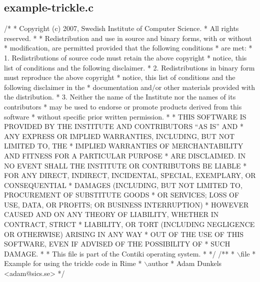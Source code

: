 \hypertarget{a00034}{}\subsection{example-\/trickle.\+c}

\begin{DoxyCodeInclude}
\textcolor{comment}{/*}
\textcolor{comment}{ * Copyright (c) 2007, Swedish Institute of Computer Science.}
\textcolor{comment}{ * All rights reserved.}
\textcolor{comment}{ *}
\textcolor{comment}{ * Redistribution and use in source and binary forms, with or without}
\textcolor{comment}{ * modification, are permitted provided that the following conditions}
\textcolor{comment}{ * are met:}
\textcolor{comment}{ * 1. Redistributions of source code must retain the above copyright}
\textcolor{comment}{ *    notice, this list of conditions and the following disclaimer.}
\textcolor{comment}{ * 2. Redistributions in binary form must reproduce the above copyright}
\textcolor{comment}{ *    notice, this list of conditions and the following disclaimer in the}
\textcolor{comment}{ *    documentation and/or other materials provided with the distribution.}
\textcolor{comment}{ * 3. Neither the name of the Institute nor the names of its contributors}
\textcolor{comment}{ *    may be used to endorse or promote products derived from this software}
\textcolor{comment}{ *    without specific prior written permission.}
\textcolor{comment}{ *}
\textcolor{comment}{ * THIS SOFTWARE IS PROVIDED BY THE INSTITUTE AND CONTRIBUTORS ``AS IS'' AND}
\textcolor{comment}{ * ANY EXPRESS OR IMPLIED WARRANTIES, INCLUDING, BUT NOT LIMITED TO, THE}
\textcolor{comment}{ * IMPLIED WARRANTIES OF MERCHANTABILITY AND FITNESS FOR A PARTICULAR PURPOSE}
\textcolor{comment}{ * ARE DISCLAIMED.  IN NO EVENT SHALL THE INSTITUTE OR CONTRIBUTORS BE LIABLE}
\textcolor{comment}{ * FOR ANY DIRECT, INDIRECT, INCIDENTAL, SPECIAL, EXEMPLARY, OR CONSEQUENTIAL}
\textcolor{comment}{ * DAMAGES (INCLUDING, BUT NOT LIMITED TO, PROCUREMENT OF SUBSTITUTE GOODS}
\textcolor{comment}{ * OR SERVICES; LOSS OF USE, DATA, OR PROFITS; OR BUSINESS INTERRUPTION)}
\textcolor{comment}{ * HOWEVER CAUSED AND ON ANY THEORY OF LIABILITY, WHETHER IN CONTRACT, STRICT}
\textcolor{comment}{ * LIABILITY, OR TORT (INCLUDING NEGLIGENCE OR OTHERWISE) ARISING IN ANY WAY}
\textcolor{comment}{ * OUT OF THE USE OF THIS SOFTWARE, EVEN IF ADVISED OF THE POSSIBILITY OF}
\textcolor{comment}{ * SUCH DAMAGE.}
\textcolor{comment}{ *}
\textcolor{comment}{ * This file is part of the Contiki operating system.}
\textcolor{comment}{ *}
\textcolor{comment}{ */}
\textcolor{comment}{}
\textcolor{comment}{/**}
\textcolor{comment}{ * \(\backslash\)file}
\textcolor{comment}{ *         Example for using the trickle code in Rime}
\textcolor{comment}{ * \(\backslash\)author}
\textcolor{comment}{ *         Adam Dunkels <adam@sics.se>}
\textcolor{comment}{ */}


\end{DoxyCodeInclude}
